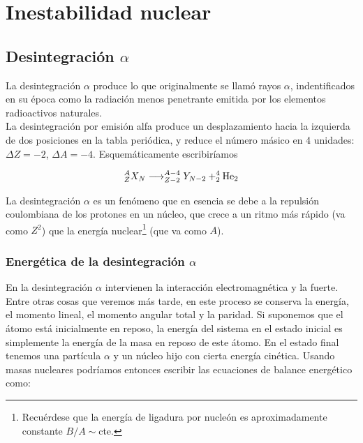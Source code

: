 \chapter{Inestabilidad nuclear}

\section{Desintegración $\alpha$}

La desintegración $\alpha$ produce lo que originalmente se llamó rayos $\alpha$, indentificados en su época como la radiación menos penetrante emitida por los elementos radioactivos naturales. \\ %

La desintegración por emisión alfa produce un desplazamiento hacia la izquierda de dos posiciones en la tabla periódica, y reduce el número másico en 4 unidades: $\Delta Z = -2$, $\Delta A = - 4$. Esquemáticamente escribiríamos

\begin{equation}
    ^A_Z  X_N \longrightarrow ^{A-4}_{Z-2} Y_{N-2} + ^4_2\text{He}_2
\end{equation}


La desintegración $\alpha$ es un fenómeno que en esencia se debe a la repulsión coulombiana de los protones en un núcleo, que crece a un ritmo más rápido (va como $Z^2$) que la energía nuclear\footnote{Recuérdese que la energía de ligadura por nucleón es aproximadamente constante $B/A \sim $cte.} (que va como $A$).  %

\subsection{Energética de la desintegración $\alpha$}

En la desintegración $\alpha$ intervienen la interacción electromagnética y la fuerte.  Entre otras cosas que veremos más tarde, en este proceso se conserva la energía, el momento lineal, el momento angular total y la paridad. Si suponemos que el átomo está inicialmente en reposo, la energía del sistema en el estado inicial es simplemente la energía de la masa en reposo de este átomo. En el estado final tenemos una partícula $\alpha$ y un núcleo hijo con cierta energía cinética. Usando masas nucleares podríamos entonces escribir las ecuaciones de balance energético como:

